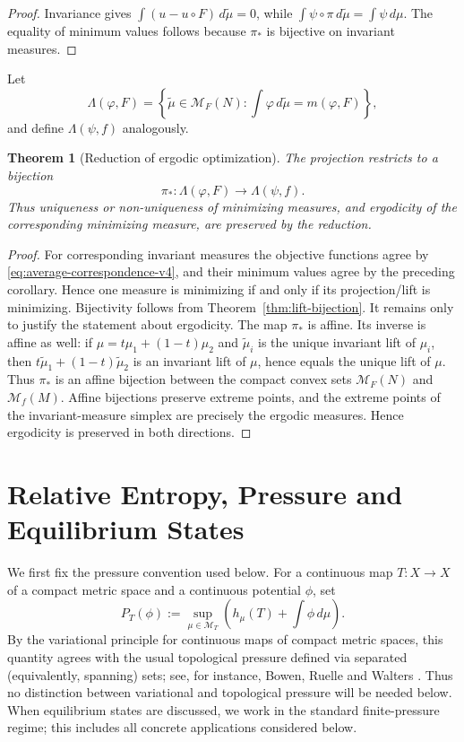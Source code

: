 \documentclass[11pt,a4paper]{article}
\newtheorem{theorem}{Theorem}[section]
\newcommand{\M}{\mathcal M}
\begin{document}
\begin{proof}
Invariance gives
$\int(u-u\circ F)\,d\widetilde\mu=0$, while
$\int\psi\circ\pi\,d\widetilde\mu=\int\psi\,d\mu$. The equality of
minimum values follows because $\pi_*$ is bijective on invariant measures.
\end{proof}

Let
\[
\Lambda(\varphi,F)=\left\{\widetilde\mu\in\M_F(N):
\int\varphi\,d\widetilde\mu=m(\varphi,F)\right\},
\]
and define $\Lambda(\psi,f)$ analogously.

\begin{theorem}[Reduction of ergodic optimization]
\label{thm:ergodic-optimization}
The projection restricts to a bijection
\[
\boxed{\pi_*:\Lambda(\varphi,F)\longrightarrow\Lambda(\psi,f).}
\]
Thus uniqueness or non-uniqueness of minimizing measures, and ergodicity of
the corresponding minimizing measure, are preserved by the reduction.
\end{theorem}

\begin{proof}
For corresponding invariant measures the objective functions agree by
\eqref{eq:average-correspondence-v4}, and their minimum values agree by the
preceding corollary. Hence one measure is minimizing if and only if its
projection/lift is minimizing. Bijectivity follows from
Theorem~\ref{thm:lift-bijection}. It remains only to justify the statement
about ergodicity. The map $\pi_*$ is affine. Its inverse is affine as well:
if $\mu=t\mu_1+(1-t)\mu_2$ and $\widetilde\mu_i$ is the unique invariant
lift of $\mu_i$, then $t\widetilde\mu_1+(1-t)\widetilde\mu_2$ is an invariant
lift of $\mu$, hence equals the unique lift of $\mu$. Thus $\pi_*$ is an
affine bijection between the compact convex sets $\M_F(N)$ and $\M_f(M)$.
Affine bijections preserve extreme points, and the extreme points of the
invariant-measure simplex are precisely the ergodic measures. Hence
ergodicity is preserved in both directions.
\end{proof}

\section{Relative Entropy, Pressure and Equilibrium States}\label{sec:pressure}

We first fix the pressure convention used below. For a continuous map
$T:X\to X$ of a compact metric space and a continuous potential $\phi$, set
\begin{equation}
P_T(\phi)
:=\sup_{\mu\in\M_T}
\left(h_\mu(T)+\int\phi\,d\mu\right).
\label{eq:variational-pressure-definition}
\end{equation}
By the variational principle for continuous maps of compact metric spaces,
this quantity agrees with the usual topological pressure defined via
separated (equivalently, spanning) sets; see, for instance, Bowen, Ruelle and Walters
\cite{Bowen,Ruelle,Walters}. Thus no distinction between variational and topological
pressure will be needed below.
When equilibrium states are discussed, we work in the standard finite-pressure
regime; this includes all concrete applications considered below.
\end{document}
